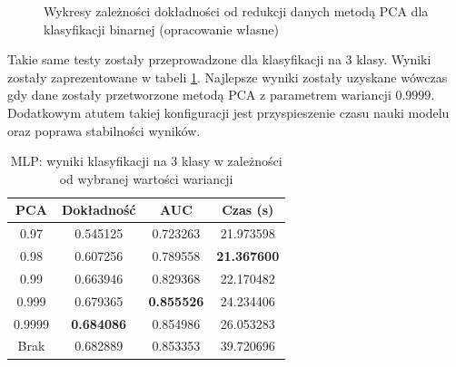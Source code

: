 \documentclass[a4paper, twoside, 11pt, openright]{article}
\begin{document}
\begin{figure}[H]
\qquad
{}%

\caption{Wykresy zależności dokładności od redukcji danych metodą PCA dla klasyfikacji binarnej (opracowanie własne)}
\label{img:nn_pca_binary_vs_accuracy}
\end{figure}

Takie same testy zostały przeprowadzone dla klasyfikacji na 3 klasy. Wyniki zostały zaprezentowane w tabeli \ref{tab:nn_pca_discrete}. Najlepsze wyniki zostały uzyskane wówczas gdy dane zostały przetworzone metodą PCA z parametrem wariancji $0.9999$. Dodatkowym atutem takiej konfiguracji jest przyspieszenie czasu nauki modelu oraz poprawa stabilności wyników. 

\begin{table}[H]
    \centering
    \begin{tabular}{|c|c|c|c|}
    \hline
        \textbf{PCA} & \textbf{Dokładność} &  \textbf{AUC} &  \textbf{Czas (s)} \\ \hline
0.97               &  0.545125 &  0.723263 &   21.973598 \\ \hline
0.98               &  0.607256 &  0.789558 &   \textbf{21.367600} \\ \hline
0.99               &  0.663946 &  0.829368 &   22.170482 \\ \hline
0.999               &  0.679365 &  \textbf{0.855526} &   24.234406 \\ \hline
0.9999             &  \textbf{0.684086} &  0.854986 &   26.053283 \\ \hline
Brak                &  0.682889 &  0.853353 &   39.720696 \\ \hline
    \end{tabular}
    \caption{MLP: wyniki klasyfikacji na 3 klasy w zależności od wybranej wartości wariancji}
    \label{tab:nn_pca_discrete}
\end{table}
\end{document}
